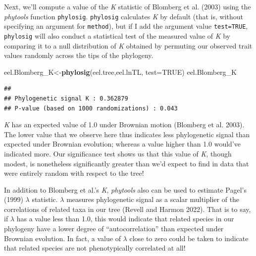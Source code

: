 \documentclass[fleqn,10pt,lineno]{wlpeerj} %
\newenvironment{Shaded}{\begin{snugshade}}{\end{snugshade}}
\newcommand{\AttributeTok}[1]{\textcolor[rgb]{0.13,0.29,0.53}{#1}}
\newcommand{\ConstantTok}[1]{\textcolor[rgb]{0.56,0.35,0.01}{#1}}
\newcommand{\FunctionTok}[1]{\textcolor[rgb]{0.13,0.29,0.53}{\textbf{#1}}}
\newcommand{\NormalTok}[1]{#1}
\newcommand{\OtherTok}[1]{\textcolor[rgb]{0.56,0.35,0.01}{#1}}
\newcommand{\SpecialCharTok}[1]{\textcolor[rgb]{0.81,0.36,0.00}{\textbf{#1}}}
\begin{document}
\begin{Shaded}
\end{Shaded}

Next, we'll compute a value of the \emph{K} statistic of Blomberg et al. (2003) using the \emph{phytools} function \texttt{phylosig}. \texttt{phylosig} calculates \emph{K} by default (that is, without specifying an argument for \texttt{method}), but if I add the argument value \texttt{test=TRUE}, \texttt{phylosig} will also conduct a statistical test of the measured value of \emph{K} by comparing it to a null distribution of \emph{K} obtained by permuting our observed trait values randomly across the tips of the phylogeny.

\begin{Shaded}
\begin{Highlighting}[]
\NormalTok{eel.Blomberg\_K}\OtherTok{\textless{}{-}}\FunctionTok{phylosig}\NormalTok{(eel.tree,eel.lnTL,}
  \AttributeTok{test=}\ConstantTok{TRUE}\NormalTok{)}
\NormalTok{eel.Blomberg\_K}
\end{Highlighting}
\end{Shaded}

\begin{verbatim}
## 
## Phylogenetic signal K : 0.362879 
## P-value (based on 1000 randomizations) : 0.043
\end{verbatim}

\emph{K} has an expected value of 1.0 under Brownian motion (Blomberg et al. 2003). The lower value that we observe here thus indicates less phylogenetic signal than expected under Brownian evolution; whereas a value higher than 1.0 would've indicated more. Our significance test shows us that this value of \emph{K}, though modest, is nonetheless significantly greater than we'd expect to find in data that were entirely random with respect to the tree!

In addition to Blomberg et al.'s \emph{K}, \emph{phytools} also can be used to estimate Pagel's (1999) \(\lambda\) statistic. \(\lambda\) measures phylogenetic signal as a scalar multiplier of the correlations of related taxa in our tree (Revell and Harmon 2022). That is to say, if \(\lambda\) has a value less than 1.0, this would indicate that related species in our phylogeny have a lower degree of ``autocorrelation'' than expected under Brownian evolution. In fact, a value of \(\lambda\) close to zero could be taken to indicate that related species are not phenotypically correlated at all!
\end{document}
